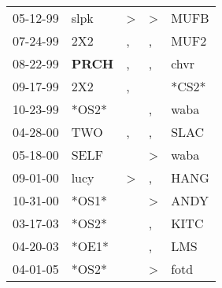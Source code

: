 \begin{supertabular}{p{0.07\textwidth}p{0.06\textwidth}p{0.02\textwidth}p{0.02\textwidth}p{0.06\textwidth}}
 05-12-99\textsuperscript{} &           slpk\textsuperscript{} &  \textgreater &  \textgreater &  MUFB\textsuperscript{} \\
 07-24-99\textsuperscript{} &            2X2\textsuperscript{} &             , &             , &  MUF2\textsuperscript{} \\
 08-22-99\textsuperscript{} &  \textbf{PRCH\textsuperscript{}} &             , &             , &  chvr\textsuperscript{} \\
 09-17-99\textsuperscript{} &            2X2\textsuperscript{} &             , &               &                   *CS2* \\
 10-23-99\textsuperscript{} &                            *OS2* &               &             , &  waba\textsuperscript{} \\
 04-28-00\textsuperscript{} &            TWO\textsuperscript{} &             , &             , &  SLAC\textsuperscript{} \\
 05-18-00\textsuperscript{} &           SELF\textsuperscript{} &               &  \textgreater &  waba\textsuperscript{} \\
 09-01-00\textsuperscript{} &           lucy\textsuperscript{} &  \textgreater &             , &  HANG\textsuperscript{} \\
 10-31-00\textsuperscript{} &                            *OS1* &               &  \textgreater &  ANDY\textsuperscript{} \\
 03-17-03\textsuperscript{} &                            *OS2* &               &             , &  KITC\textsuperscript{} \\
 04-20-03\textsuperscript{} &                            *OE1* &               &             , &   LMS\textsuperscript{} \\
 04-01-05\textsuperscript{} &                            *OS2* &               &  \textgreater &  fotd\textsuperscript{} \\
\end{supertabular}
